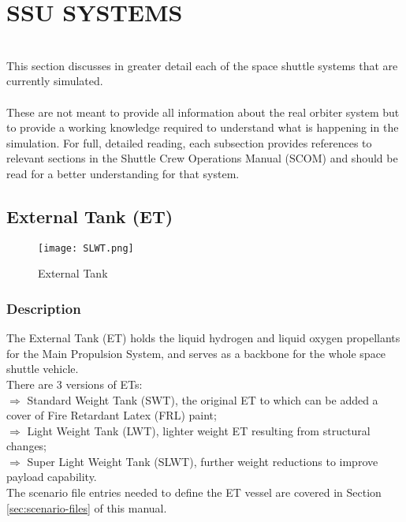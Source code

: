 \documentclass[Space_Shuttle_Ultra_Manual.tex]{subfiles}
\begin{document}
\section{SSU SYSTEMS}
\begin{multicols*}{2}
\renewcommand{\cfttoctitlefont}{\bf}
\localtableofcontents
\noindent
\\
This section discusses in greater detail each of the space shuttle systems that are currently simulated.\\
\\
These are not meant to provide all information about the real orbiter system but to provide a working knowledge required to understand what is happening in the simulation. For full, detailed reading, each subsection provides references to relevant sections in the Shuttle Crew Operations Manual (SCOM) and should be read for a better understanding for that system.
\end{multicols*}

\subsection{External Tank (ET)}
\begin{figure}[b!]
  \texttt{[image: SLWT.png]}
  \caption{External Tank}
  \label{fig:ET}
\end{figure}
\begin{multicols*}{2}
\renewcommand{\cfttoctitlefont}{\bf}
\localtableofcontents
\subsubsection{Description}
The External Tank (ET) holds the liquid hydrogen and liquid oxygen propellants for the Main Propulsion System, and serves as a backbone for the whole space shuttle vehicle.\\
There are 3 versions of ETs$\colon$\\
$\Rightarrow$ Standard Weight Tank (SWT), the original ET to which can be added a cover of Fire Retardant Latex (FRL) paint;\\
$\Rightarrow$ Light Weight Tank (LWT), lighter weight ET resulting from structural changes;\\
$\Rightarrow$ Super Light Weight Tank (SLWT), further weight reductions to improve payload capability.\\
The scenario file entries needed to define the ET vessel are covered in Section \ref{sec:scenario-files} of this manual.
\end{multicols*}
\end{document}
